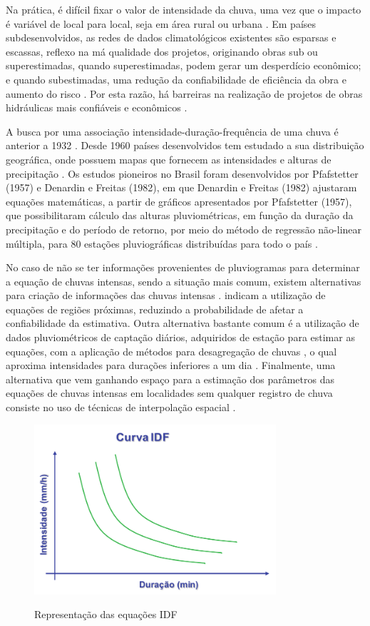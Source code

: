 Na prática, é difícil fixar o valor de intensidade da chuva, uma vez que o impacto é variável de local para local, seja em área rural ou urbana \cite{hidro-basica}. Em países subdesenvolvidos, as redes de dados climatológicos existentes são esparsas e escassas, reflexo na má qualidade dos projetos, originando obras sub ou superestimadas, quando superestimadas, podem gerar um desperdício econômico; e quando subestimadas, uma redução da confiabilidade de eficiência da obra e aumento do risco \cite{tucci1993}. Por esta razão, há barreiras na realização de projetos de obras hidráulicas mais confiáveis e econômicos \cite{chuva-bahia}. 

A busca por uma associação intensidade-duração-frequência de uma chuva é anterior a 1932 \cite{desagregacao}. Desde 1960 países desenvolvidos tem estudado a sua distribuição geográfica, onde possuem mapas que fornecem as intensidades e alturas de precipitação \cite{desagregacao}. Os estudos pioneiros no Brasil foram desenvolvidos por Pfafstetter (1957) e Denardin e Freitas (1982), em que Denardin e Freitas (1982) ajustaram equações matemáticas, a partir de gráficos apresentados por Pfafstetter (1957), que possibilitaram cálculo das alturas pluviométricas, em função da duração da precipitação e do período de retorno, por meio do método de regressão não-linear múltipla, para 80 estações pluviográficas distribuídas para todo o país \cite{relacao-idf-nordeste}.

No caso de não se ter informações provenientes de pluviogramas para determinar a equação de chuvas intensas, sendo a situação mais comum, existem alternativas para criação de informações das chuvas intensas \cite{interpolacao-chuva}.  indicam a utilização de equações de regiões próximas, reduzindo a probabilidade de afetar a confiabilidade da estimativa. Outra alternativa bastante comum é a utilização de dados pluviométricos de captação diários, adquiridos de estação para estimar as equações, com a aplicação de métodos para desagregação de chuvas \cite{idf-rs}, o qual aproxima intensidades para durações inferiores a um dia \cite{relacoes-sc}. Finalmente, uma alternativa que vem ganhando espaço para a estimação dos parâmetros das equações de chuvas intensas em localidades sem qualquer registro de chuva consiste no uso de técnicas de interpolação espacial \cite{chuva-bahia}.

\begin{figure}[H]
    \caption{Representação das equações IDF}
    \centering
    \includegraphics[width=0.8\textwidth]{Textuais/Figuras/curva-idf.pdf}
    \label{fig:desagregacao}
\end{figure}